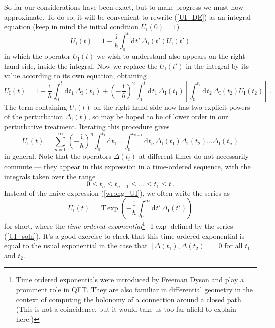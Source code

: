 \documentclass{article}
\theoremstyle{plain}\theoremheaderfont{\normalfont\itshape}\theorembodyfont{\rmfamily}\theoremseparator{.}\newtheorem*{rem}{Remark}\newtheorem*{ex}{Example}\newtheorem*{proof}{Proof}\newtheorem*{altp}{Alternative proof}
\theoremstyle{plain}\theoremheaderfont{\normalfont\bfseries}\theorembodyfont{\rmfamily}\theoremseparator{.}\newtheorem{thm}{Theorem}[section]\newtheorem{lem}[thm]{Lemma}\newtheorem{prop}[thm]{Proposition}\newtheorem*{cor}{Corollary}\newtheorem{defn}[thm]{Definition}\newtheorem{clm}[thm]{Claim}\newtheorem{clminproof}{Claim}
\theoremstyle{break}\theoremheaderfont{\normalfont\itshape}\theorembodyfont{\rmfamily}\theoremseparator{.\medskip}\newtheorem*{proofskip}{Proof}\newtheorem*{exs}{Examples}\newtheorem*{rems}{Remarks}
\theoremstyle{break}\theoremheaderfont{\normalfont\bfseries}\theorembodyfont{\rmfamily}\theoremseparator{.\medskip}\newtheorem{lemskip}[thm]{Lemma}\newtheorem{defnskip}[thm]{Definition}\newtheorem{propskip}[thm]{Proposition}\newtheorem{thmskip}[thm]{Theorem}
\numberwithin{equation}{section}
\newcommand{\ii}{\mathrm{i}}
\newcommand{\dd}[2][]{\mathrm{d}^{#1} #2\,}
\newcommand{\I}{_{\mathrm{I}}}
\DeclareMathOperator{\Texp}{T\, exp}
\begin{document}
    So far our considerations have been exact, but to make progress we must now approximate. To do so, it will be convenient to rewrite (\ref{UI_DE}) as an integral equation (keep in mind the initial condition \(U\I(0)=1\))
    \begin{equation}
        U\I(t)=1-\frac{\ii}{\hbar}\int_{0}^{t}\dd{t'}\Delta\I(t')U\I(t')
    \end{equation}
    in which the operator \(U\I(t)\) we wish to understand also appears on the right-hand side, inside the integral. Now we replace the \(U\I(t')\) in the integral by its value according to its own equation, obtaining
    \begin{equation}\label{UI_soln}
        U\I(t)=1-\frac{\ii}{\hbar}\int_{0}^{t}\dd{t_1}\Delta\I(t_1)+\left(-\frac{\ii}{\hbar}\right)^2\int_{0}^{t}\dd{t_1} \Delta\I(t_1)\left[\int_{0}^{t_1}\dd{t_2}\Delta\I(t_2)U\I(t_2)\right]\,.
    \end{equation}
    The term containing \(U\I(t)\) on the right-hand side now has two explicit powers of the perturbation \(\Delta\I(t)\), so may be hoped to be of lower order in our perturbative treatment. Iterating this procedure gives
    \begin{equation}
        U\I(t)=\sum_{n=0}^{\infty}\left(-\frac{\ii}{\hbar}\right)^n\int_{0}^{t_1}\dd{t_1}\dots\int_{0}^{t_{n-1}}\dd{t_n}\Delta\I(t_1)\Delta\I(t_2)\dots\Delta\I(t_n)
    \end{equation}
    in general. Note that the operators \(\Delta(t_i)\) at different times do not necessarily commute --- they appear in this expression in a time-ordered sequence, with the integrals taken over the range
    \begin{equation}
        0\le t_n\le t_{n-1}\le\dots\le t_1\le t\,.
    \end{equation}
    Instead of the naive expression (\ref{wrong_UI}), we often write the series as
    \begin{equation}
        U\I(t)=\Texp\left(-\frac{\ii}{\hbar}\int_{0}^{\infty}\dd{t'}\Delta\I (t')\right)
    \end{equation}
    for short, where the \textit{time-ordered exponential}\footnote{Time ordered exponentials were introduced by Freeman Dyson and play a prominent role in QFT. They are also familiar in differential geometry in the context of computing the holonomy of a connection around a closed path. (This is not a coincidence, but it would take us too far afield to explain here.)} \(\Texp\) defined by the series (\ref{UI_soln}).  It's a good exercise to check that this time-ordered exponential is equal to the usual exponential in the case that \([\Delta(t_1),\Delta(t_2)]=0\) for all \(t_1\) and \(t_2\).
\end{document}

